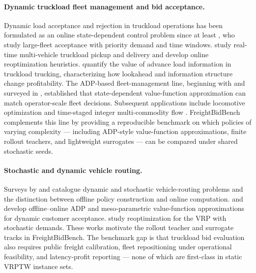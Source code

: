 \documentclass[11pt]{article}
\begin{document}
\paragraph{Dynamic truckload fleet management and bid acceptance.}
Dynamic load acceptance and rejection in truckload operations has been
formulated as an online state-dependent control problem since at least
\citet{kim2004dynamic}, who study large-fleet acceptance with priority
demand and time windows. \citet{yang2004realtime} study real-time
multi-vehicle truckload pickup and delivery and develop online
reoptimization heuristics. \citet{tjokroamidjojo2006quickresponse}
quantify the value of advance load information in truckload trucking,
characterizing how lookahead and information structure change
profitability. The ADP-based fleet-management line, beginning with
\citet{simao2009adp} and surveyed in \citet{powell2007stochastic},
established that state-dependent value-function approximation can match
operator-scale fleet decisions. Subsequent applications include locomotive
optimization \citep{powell2014locomotive} and time-staged integer
multi-commodity flow \citep{topaloglu2006dynamic}. FreightBidBench
complements this line by providing a reproducible benchmark on which
policies of varying complexity --- including ADP-style value-function
approximations, finite rollout teachers, and lightweight surrogates ---
can be compared under shared stochastic seeds.

\paragraph{Stochastic and dynamic vehicle routing.}
Surveys by \citet{pillac2013review} and \citet{ritzinger2016survey}
catalogue dynamic and stochastic vehicle-routing problems and the
distinction between offline policy construction and online computation.
\citet{ulmer2019offline} and \citet{ulmer2020meso} develop offline--online
ADP and meso-parametric value-function approximations for dynamic
customer acceptance. \citet{secomandi2008reoptimization} study
reoptimization for the VRP with stochastic demands. These works motivate
the rollout teacher and surrogate tracks in FreightBidBench. The
benchmark gap is that truckload bid evaluation also requires public
freight calibration, fleet repositioning under operational feasibility,
and latency-profit reporting --- none of which are first-class in static
VRPTW instance sets.
\end{document}
